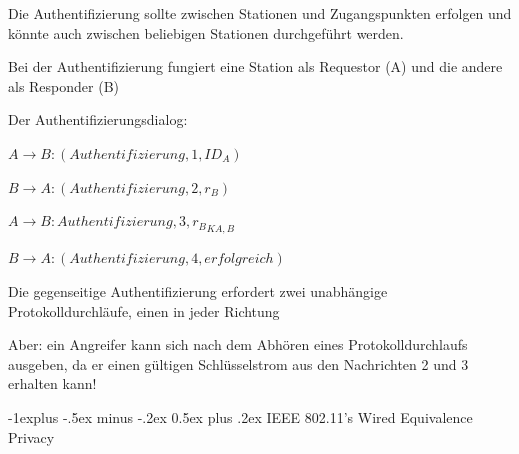 \documentclass[a4paper]{article}
\makeatletter
\renewcommand{\subsection}{\@startsection{subsection}{2}{0mm}%
 {-1explus -.5ex minus -.2ex}%
 {0.5ex plus .2ex}%
 {\normalfont\normalsize\bfseries}}
\makeatother
\begin{document}
\begin{multicols}{3}
      \begin{itemize*}
            \item Die Authentifizierung sollte zwischen Stationen und Zugangspunkten
            erfolgen und könnte auch zwischen beliebigen Stationen durchgeführt
            werden.
            \item Bei der Authentifizierung fungiert eine Station als Requestor (A) und
            die andere als Responder (B)
            \item Der Authentifizierungsdialog:
            \begin{enumerate*}
                  \def\labelenumi{\arabic{enumi}.}
                  \item $A \rightarrow B: (Authentifizierung, 1, ID_A)$
                  \item $B \rightarrow A: (Authentifizierung, 2, r_B)$
                  \item $A \rightarrow B: {Authentifizierung, 3, r_B}_{{K}{A,B}}$
                  \item $B \rightarrow A: (Authentifizierung, 4, erfolgreich)$
            \end{enumerate*}
            \item Die gegenseitige Authentifizierung erfordert zwei unabhängige
            Protokolldurchläufe, einen in jeder Richtung
            \item Aber: ein Angreifer kann sich nach dem Abhören eines
            Protokolldurchlaufs ausgeben, da er einen gültigen Schlüsselstrom aus
            den Nachrichten 2 und 3 erhalten kann!
      \end{itemize*}


      \subsection{IEEE 802.11's Wired Equivalence
            Privacy}


\end{multicols}
\end{document}
